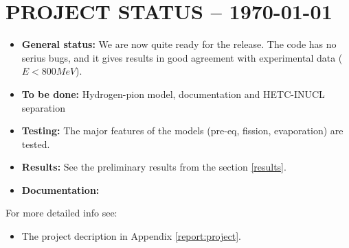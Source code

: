 \section{PROJECT STATUS -- \today  } %


\begin{itemize}
\item {\bf General status:} 
We are now quite ready for the release. 
The code has no serius bugs,
and it gives results in good agreement with experimental data ( $E < 800 MeV$). 
\item {\bf To be done:} Hydrogen-pion model, 
documentation  and HETC-INUCL separation
\item {\bf Testing:} The major features of the models (pre-eq, fission, evaporation) are tested. 
\item {\bf Results:} See the preliminary results from the section \ref{results}.
\item {\bf Documentation:} 
\end{itemize}


For more detailed info see: 
\begin{itemize}
\item The project decription in Appendix \ref{report:project}.

\end{itemize}



